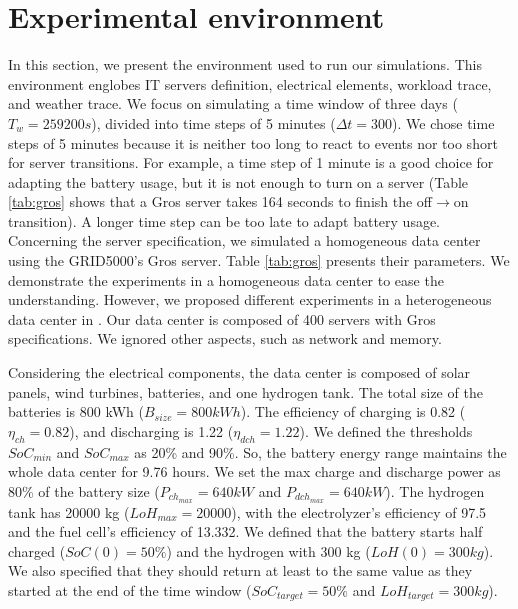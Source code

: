 \section{Experimental environment}
\label{sec:experiment_environment}

In this section, we present the environment used to run our simulations. This environment englobes IT servers definition, electrical elements, workload trace, and weather trace. We focus on simulating a time window of three days ($T_{w}=259200 s$), divided into time steps of 5 minutes ($\Delta t=300$). We chose time steps of 5 minutes because it is neither too long to react to events nor too short for server transitions. For example, a time step of 1 minute is a good choice for adapting the battery usage, but it is not enough to turn on a server (Table \ref{tab:gros} shows that a Gros server takes 164 seconds to finish the off$\rightarrow$on transition). A longer time step can be too late to adapt battery usage. Concerning the server specification, we simulated a homogeneous data center using the GRID5000's Gros server. Table \ref{tab:gros} presents their parameters. We demonstrate the experiments in a homogeneous data center to ease the understanding. However, we proposed different experiments in a heterogeneous data center in \cite{de2022analyzing}. Our data center is composed of 400 servers with Gros specifications. We ignored other aspects, such as network and memory. 

Considering the electrical components, the data center is composed of solar panels, wind turbines, batteries, and one hydrogen tank. The total size of the batteries is 800 kWh ($B_{size}=800kWh$). The efficiency of charging is 0.82 ($\eta_{ch}=0.82$), and discharging is 1.22 ($\eta_{dch}=1.22$). We defined the thresholds $SoC_{min}$ and $SoC_{max}$ as 20\% and 90\%. So, the battery energy range maintains the whole data center for 9.76 hours. We set the max charge and discharge power as 80\% of the battery size ($P_{ch_{max}}=640kW$ and $P_{dch_{max}}=640kW$). The hydrogen tank has 20000 kg ($LoH_{max}=20000$), with the electrolyzer's efficiency of 97.5 and the fuel cell's efficiency of 13.332. We defined that the battery starts half charged ($SoC(0)=50\%$) and the hydrogen with 300 kg ($LoH(0)=300kg$). We also specified that they should return at least to the same value as they started at the end of the time window ($SoC_{target} = 50\%$ and $LoH_{target}=300kg$).

